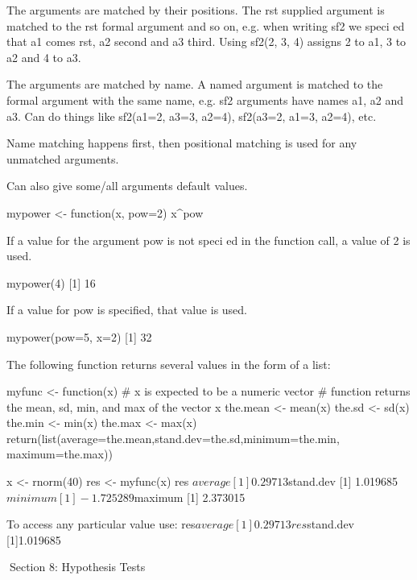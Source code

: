 The arguments are matched by their positions. The rst supplied argument is matched to the rst formal argument and so on, e.g. when writing sf2 we speci ed that a1 comes rst, a2 second and a3 third. Using sf2(2, 3, 4) assigns 2 to a1, 3 to a2 and 4 to a3.
 
The arguments are matched by name. A named argument is matched to the formal argument with the same name, e.g.
sf2 arguments have names a1, a2 and a3. Can do things like sf2(a1=2, a3=3, a2=4), sf2(a3=2, a1=3, a2=4), etc.
 
Name matching happens first, then positional matching is used for any unmatched arguments.
 

Can also give some/all arguments default values.
 
mypower <- function(x, pow=2){
x^pow
}
 
If a value for the argument pow is not speci ed in the function call, a value of 2 is used.
 


mypower(4)
[1] 16




 
If a value for pow is specified, that value is used.
 



mypower(pow=5, x=2)
[1] 32
 




The following function returns several values in the form of a list:



myfunc <- function(x)
{
# x is expected to be a numeric vector
# function returns the mean, sd, min, and max of the vector x
the.mean <- mean(x)
the.sd <- sd(x)
the.min <- min(x)
the.max <- max(x)
return(list(average=the.mean,stand.dev=the.sd,minimum=the.min,
maximum=the.max))
}
 



x <- rnorm(40)
res <- myfunc(x)
res
$average
[1] 0.29713
$stand.dev
[1] 1.019685
$minimum
[1] -1.725289
$maximum
[1] 2.373015






 


To access any particular value use:
res$average
[1] 0.29713
res$stand.dev
[1]1.019685







 
Section 8: Hypothesis Tests

